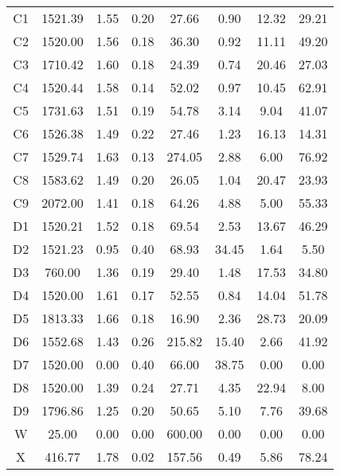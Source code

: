 \begin{table}[h!]
\begin{tabular}{c c c c c c c c}
			C1	 & 	1521.39	 & 	1.55	 & 	0.20	 & 	27.66	 & 	0.90	 & 	12.32	 & 	29.21 \\
			C2	 & 	1520.00	 & 	1.56	 & 	0.18	 & 	36.30	 & 	0.92	 & 	11.11	 & 	49.20 \\
			C3	 & 	1710.42	 & 	1.60	 & 	0.18	 & 	24.39	 & 	0.74	 & 	20.46	 & 	27.03 \\
			C4	 & 	1520.44	 & 	1.58	 & 	0.14	 & 	52.02	 & 	0.97	 & 	10.45	 & 	62.91 \\
			C5	 & 	1731.63	 & 	1.51	 & 	0.19	 & 	54.78	 & 	3.14	 & 	9.04	 & 	41.07 \\
			C6	 & 	1526.38	 & 	1.49	 & 	0.22	 & 	27.46	 & 	1.23	 & 	16.13	 & 	14.31 \\
			C7	 & 	1529.74	 & 	1.63	 & 	0.13	 & 	274.05	 & 	2.88	 & 	6.00	 & 	76.92 \\
			C8	 & 	1583.62	 & 	1.49	 & 	0.20	 & 	26.05	 & 	1.04	 & 	20.47	 & 	23.93 \\
			C9	 & 	2072.00	 & 	1.41	 & 	0.18	 & 	64.26	 & 	4.88	 & 	5.00	 & 	55.33 \\
			D1	 & 	1520.21	 & 	1.52	 & 	0.18	 & 	69.54	 & 	2.53	 & 	13.67	 & 	46.29 \\
			D2	 & 	1521.23	 & 	0.95	 & 	0.40	 & 	68.93	 & 	34.45	 & 	1.64	 & 	5.50 \\
			D3	 & 	760.00	 & 	1.36	 & 	0.19	 & 	29.40	 & 	1.48	 & 	17.53	 & 	34.80 \\
			D4	 & 	1520.00	 & 	1.61	 & 	0.17	 & 	52.55	 & 	0.84	 & 	14.04	 & 	51.78 \\
			D5	 & 	1813.33	 & 	1.66	 & 	0.18	 & 	16.90	 & 	2.36	 & 	28.73	 & 	20.09 \\
			D6	 & 	1552.68	 & 	1.43	 & 	0.26	 & 	215.82	 & 	15.40	 & 	2.66	 & 	41.92 \\
			D7	 & 	1520.00	 & 	0.00	 & 	0.40	 & 	66.00	 & 	38.75	 & 	0.00	 & 	0.00 \\
			D8	 & 	1520.00	 & 	1.39	 & 	0.24	 & 	27.71	 & 	4.35	 & 	22.94	 & 	8.00 \\
			D9	 & 	1796.86	 & 	1.25	 & 	0.20	 & 	50.65	 & 	5.10	 & 	7.76	 & 	39.68 \\
			W	 & 	25.00	 & 	0.00	 & 	0.00	 & 	600.00	 & 	0.00	 & 	0.00	 & 	0.00 \\
			X	 & 	416.77	 & 	1.78	 & 	0.02	 & 	157.56	 & 	0.49	 & 	5.86	 & 	78.24 \\
			\hline		
		\end{tabular}
		
		\label{table:soil_prop}
	\end{table}	
	
	